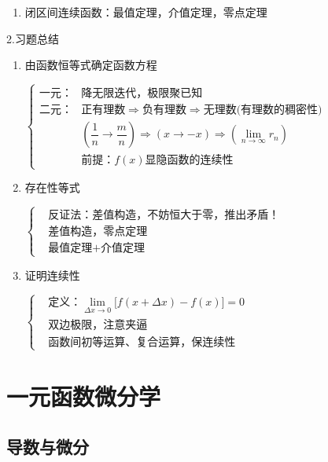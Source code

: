 \documentclass[UTF8]{ctexart}
\newcommand\no{\noindent}
\newcommand\dis{\displaystyle}
\newcommand\limit{\dis\lim\limits}
\newcommand\limn{\dis\lim\limits_{n\to\infty}}
\begin{document}
\begin{spacing}{2}
\begin{enumerate}[itemindent=1.4em, label=(\arabic*)]
\item 闭区间连续函数：最值定理，介值定理，零点定理

\end{enumerate}

\no2.习题总结

\begin{enumerate}[itemindent=1.4em, label=(\arabic*)]

\item 由函数恒等式确定函数方程

$\left\{\begin{aligned}
\text{一元：}&\text{降无限迭代，极限聚已知}\\
\text{二元：}&\text{正有理数}\Rightarrow\text{负有理数}\Rightarrow
\text{无理数(有理数的稠密性)}\\
&\left(\dfrac{1}{n}\to\dfrac{m}{n}\right)\Rightarrow
(x\to -x)\Rightarrow\left(\limn r_n\right)\\
&\text{前提：}f(x)\text{显隐函数的连续性}
\end{aligned}\right.$

\item 存在性等式

$\left\{\begin{aligned}
&\text{反证法：差值构造，不妨恒大于零，推出矛盾！}\\
&\text{差值构造，零点定理}\\
&\text{最值定理+介值定理}
\end{aligned}\right.$

\item 证明连续性

$\left\{\begin{aligned}
&\text{定义：}\limit_{\Delta x\to0}\big[f(x+\Delta x)-f(x)\big]=0\\
&\text{双边极限，注意夹逼}\\
&\text{函数间初等运算、复合运算，保连续性}
\end{aligned}\right.$

\end{enumerate}

\newpage

\section{一元函数微分学}

\subsection{导数与微分}


\end{spacing}
\end{document}
